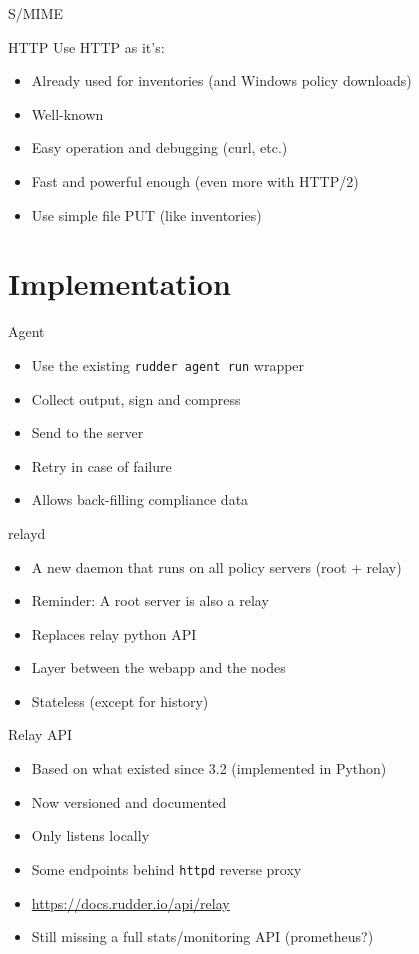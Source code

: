 \documentclass[aspectratio=169, 14pt]{beamer}
\begin{document}
\begin{frame}[standout]
	S/MIME
\end{frame}

\begin{frame}{HTTP}
	Use HTTP as it's:
	\begin{itemize}
		\item Already used for inventories (and Windows policy downloads)
		\item Well-known
		\item Easy operation and debugging (curl, etc.)
		\item Fast and powerful enough (even more with HTTP/2)
		\item Use simple file PUT (like inventories)
	\end{itemize}
\end{frame}

\section{Implementation}

\begin{frame}{Agent}
	\begin{itemize}
		\item Use the existing \texttt{rudder agent run} wrapper
		\item Collect output, sign and compress
		\item Send to the server
		\item Retry in case of failure
		\item Allows back-filling compliance data
	\end{itemize}
\end{frame}

\begin{frame}{relayd}
	\begin{itemize}
		\item A new daemon that runs on all policy servers (root + relay)
		\item Reminder: A root server is also a relay
		\item Replaces relay python API
		\item Layer between the webapp and the nodes
		\item Stateless (except for history)
	\end{itemize}
\end{frame}

\begin{frame}{Relay API}
	\begin{itemize}
		\item Based on what existed since 3.2 (implemented in Python)
		\item Now versioned and documented
		\item Only listens locally
		\item Some endpoints behind \texttt{httpd} reverse proxy
		\item \href{https://docs.rudder.io/api/relay}{https://docs.rudder.io/api/relay}
		\item Still missing a full stats/monitoring API (prometheus?)
	\end{itemize}
\end{frame}
\end{document}
